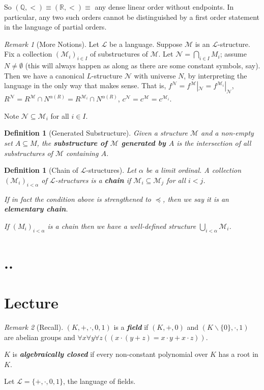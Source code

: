 \documentclass[]{article}
\theoremstyle{custhm}
\theoremstyle{cusdef}
\newtheorem{defin}[theorem]{Definition}
\theoremstyle{custhm}
\theoremstyle{custhm}
\theoremstyle{custhm}
\theoremstyle{ex}
\theoremstyle{custhm}
\theoremstyle{cusdef}
\theoremstyle{remark}
\newtheorem*{remark*}{Remark}
\theoremstyle{remark}
\theoremstyle{numremark}
\newcommand{\Q}{\mathbb{Q}}
\newcommand{\R}{\mathbb{R}}
\newcommand{\undf}[1]{\textit{\textbf{#1}}}
\renewcommand{\L}{\mathcal{L}}
\newcommand{\M}{\mathcal{M}}
\newcommand{\N}{\mathcal{N}}
\renewcommand{\subset}{\subseteq}
\begin{document}
So $(\Q,<) \equiv (\R,<)\equiv $ any dense linear order without endpoints. In particular, any two such orders cannot be distinguished by a first order statement in the language of partial orders.

\begin{remark*}[More Notions]
Let $\L$ be a language. Suppose $\M$ is an $\L$-structure. Fix a collection $(\M_i)_{i\in I}$ of substructures of $\M$. Let $\N = \bigcap_{i\in I}M_i$; assume $N \ne \emptyset$ (this will always happen as along as there are some constant symbols, say). Then we have a canonical $L$-structure $\N$ with universe $N$, by interpreting the language in the only way that makes sense. That is, $f^\N = f^\M |_\N = f^{\M_i} |_\N$, $R^\N = R^\M \cap N^{\alpha(R)} = R^{\M_i}\cap N^{\alpha(R)}$, $c^\N = c^\M = c^{\M_i}$.

Note $\N \subset \M_i$ for all $i\in I$.
\end{remark*}
\begin{defin}[Generated Substructure]
Given a structure $\M$ and a non-empty set $A\subset M$, the \undf{substructure of $\M$ generated by $A$} is the intersection of all substructures of $\M$ containing $A$.
\end{defin}

\begin{defin}[Chain of $\L$-structures]
Let $\alpha$ be a limit ordinal. A collection $(\M_i)_{i<\alpha}$ of $\L$-structures is a \undf{chain} if $\M_i \subset \M_{j}$ for all $i < j$.

If in fact the condition above is strengthened to $\preceq$, then we say it is an \undf{elementary chain}.

If $(M_i)_{i<\alpha}$ is a chain then we have a well-defined structure $\bigcup_{i < \alpha}\M_i$.
\end{defin}


\section{..}
\section{Lecture}


\begin{remark*}[Recall]
$(K,+,\cdot,0,1)$ is a \undf{field} if $(K,+,0)$ and $(K\backslash\{0\},\cdot,1)$ are abelian groups and $\forall x\forall y\forall z((x\cdot(y+z) = x\cdot y + x\cdot z))$.

$K$ is \undf{algebraically closed} if every non-constant polynomial over $K$ has a root in $K$.
\end{remark*}
Let $\L = \{+,\cdot,0,1\}$, the language of fields.
\end{document}
